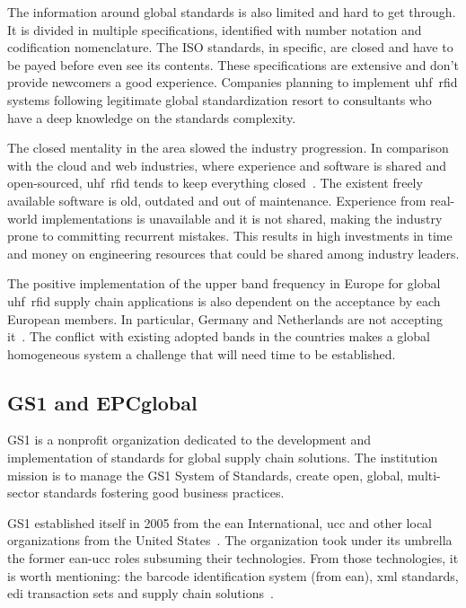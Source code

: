 The information around global standards is also limited and hard to get through. It is divided in multiple specifications, identified with number notation and codification nomenclature. 
The ISO standards, in specific, are closed and have to be payed before even see its contents.
These specifications are extensive and don't provide newcomers a good experience. 
Companies planning to implement \acs{uhf}~\acs{rfid} systems following legitimate global standardization resort to consultants who have a deep knowledge on the standards complexity.

The closed mentality in the area slowed the industry progression. In comparison with the cloud and web industries, where experience and software is shared and open-sourced, \acs{uhf}~\acs{rfid} tends to keep everything closed~\cite{WhatCouldSlow}. The existent freely available software is old, outdated and out of maintenance. Experience from real-world implementations is unavailable and it is not shared, making the industry prone to committing recurrent mistakes. This results in high investments in time and money on engineering resources that could be shared among industry leaders.

The positive implementation of the upper band frequency in Europe for global \acs{uhf}~\acs{rfid} supply chain applications is also dependent on the acceptance by each European members. In particular, Germany and Netherlands are not accepting it~\cite{EUUpperBand}. The conflict with existing adopted bands in the countries makes a global homogeneous system a challenge that will need time to be established.

\subsection{GS1 and EPCglobal}

GS1 is a nonprofit organization dedicated to the development and implementation of standards for global supply chain solutions. 
The institution mission is to manage the GS1 System of Standards, create open, global, multi-sector standards fostering good business practices.

GS1 established itself in 2005 from the \ac{ean} International, \ac{ucc} and other local organizations from the United States~\cite{PublicationLEBENSMITTELZEITUNGa}.
The organization took under its umbrella the former \acs{ean}-\acs{ucc} roles subsuming their technologies. From those technologies, it is worth mentioning: the barcode identification system (from \ac{ean}), \ac{xml} standards, \ac{edi} transaction sets and supply chain solutions~\cite{lahiriRFIDSourcebook2005}.

